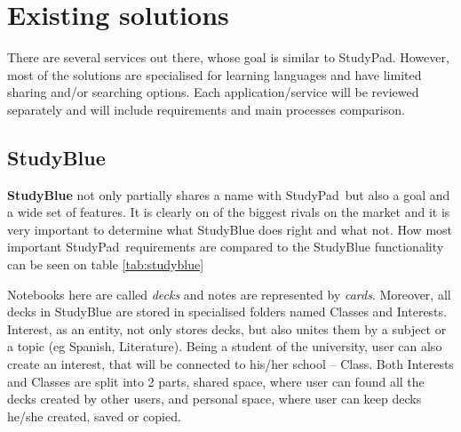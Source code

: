 \documentclass[thesis=B,english]{FITthesis}[2012/10/20]
\newcommand{\appname}{StudyPad}
\begin{document}
\newpage

\section{Existing solutions}

There are several services out there, whose goal is similar to \appname. However, most of the solutions are specialised for learning languages and have limited sharing and/or searching options. Each application/service will be reviewed separately and will include requirements and main processes comparison.

\subsection{StudyBlue}

\textbf{StudyBlue} not only partially shares a name with \appname\ but also a goal and a wide set of features. It is clearly on of the biggest rivals on the market and it is very important to determine what StudyBlue does right and what not. How most important \appname\ requirements are compared to the StudyBlue functionality can be seen on table \ref{tab:studyblue}

Notebooks here are called \textit{decks} and notes are represented by \textit{cards}. Moreover, all decks in StudyBlue are stored in specialised folders named Classes and Interests. Interest, as an entity, not only stores decks, but also unites them by a subject or a topic (eg Spanish, Literature). Being a student of the university, user can also create an interest, that will be connected to his/her school -- Class. Both Interests and Classes are split into 2 parts, shared space, where user can found all the decks created by other users, and personal space, where user can keep decks he/she created, saved or copied.
\end{document}
